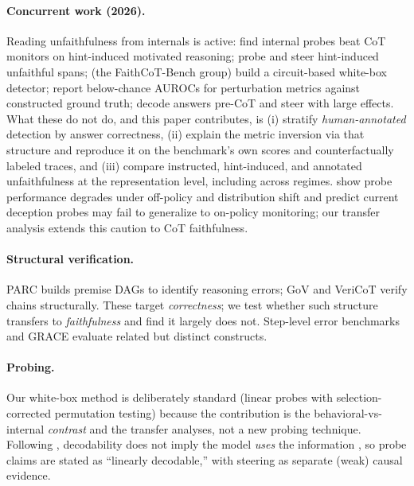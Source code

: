 \documentclass[11pt]{article}
\begin{document}
\paragraph{Concurrent work (2026).} Reading unfaithfulness from internals is active: \citet{mirtaheri2026catching} find internal probes beat CoT monitors on hint-induced motivated reasoning; \citet{occhipinti2026probing} probe and steer hint-induced unfaithful spans; \citet{shen2026cie} (the FaithCoT-Bench group) build a circuit-based white-box detector; \citet{gurarieh2026bonafide} report below-chance AUROCs for perturbation metrics against constructed ground truth; \citet{cox2026decoding} decode answers pre-CoT and steer with large effects. What these do not do, and this paper contributes, is (i) stratify \emph{human-annotated} detection by answer correctness, (ii) explain the metric inversion via that structure and reproduce it on the benchmark's own scores and counterfactually labeled traces, and (iii) compare instructed, hint-induced, and annotated unfaithfulness at the representation level, including across regimes. \citet{offpolicy2025probes} show probe performance degrades under off-policy and distribution shift and predict current deception probes may fail to generalize to on-policy monitoring; our transfer analysis extends this caution to CoT faithfulness.

\paragraph{Structural verification.} PARC \citep{mukherjee2025parc} builds premise DAGs to identify reasoning errors; GoV \citep{fang2025gov} and VeriCoT \citep{feng2025vericot} verify chains structurally. These target \emph{correctness}; we test whether such structure transfers to \emph{faithfulness} and find it largely does not. Step-level error benchmarks \citep{zheng2024processbench,jacovi2024reveal} and GRACE \citep{pham2026grace} evaluate related but distinct constructs.

\paragraph{Probing.} Our white-box method is deliberately standard (linear probes with selection-corrected permutation testing) because the contribution is the behavioral-vs-internal \emph{contrast} and the transfer analyses, not a new probing technique. Following \citet{belinkov2022probing}, decodability does not imply the model \emph{uses} the information \citep{elazar2021amnesic}, so probe claims are stated as ``linearly decodable,'' with steering as separate (weak) causal evidence.
\end{document}
